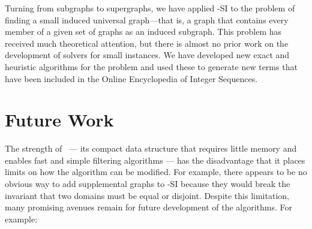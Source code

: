 Turning from subgraphs to supergraphs,
we have applied \McSplit-SI to the problem of finding a small induced universal
graph---that is, a graph that contains every member of a given set of graphs as
an induced subgraph. This problem has received much theoretical attention,
but there is almost no prior work on the development of solvers for
small instances.  We have developed new exact and heuristic algorithms for the
problem and used these to generate new terms that have been included in the
Online Encyclopedia of Integer Sequences.

\section{Future Work}

The strength of \McSplit\ --- its compact data structure that requires little
memory and enables fast and simple filtering algorithms --- has the
disadvantage that it places limits on how the algorithm can be modified.  For example, there
appears to be no obvious way to add supplemental graphs to \McSplit-SI because
they would break the invariant that two domains must be equal or disjoint.  Despite
this limitation,
many promising avenues remain for future development of the
algorithms. For example:

